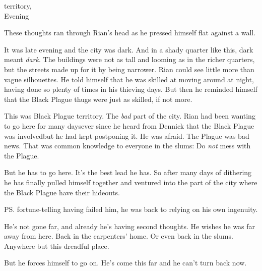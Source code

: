 \begin{comment}
\section{Rian is threatened by a thug}
\end{comment}
\stamp
  {\dateRianAndJorgen}
  {%
     territory, 
    \\
    Evening%
  }

These thoughts ran through Rian's head as he pressed himself flat against a wall. 

It was late evening and the city was dark. 
And in a shady quarter like this, dark meant \emph{dark}. 
The buildings were not as tall and looming as in the richer quarters, but the streets made up for it by being narrower. 
Rian could see little more than vague silhouettes. 
He told himself that he was skilled at moving around at night, having done so plenty of times in his thieving days. 
But then he reminded himself that the Black Plague thugs were just as skilled, if not more. 


This was Black Plague territory. 
The \emph{bad} part of the city. 
Rian had been wanting to go here for many days\dash ever since he heard from Dennick that the Black Plague was involved\dash but he had kept postponing it.
He was afraid. 
The Plague was bad news. 
That was common knowledge to everyone in the slums: 
Do \emph{not} mess with the Plague. 

But he has to go here. 
It's the best lead he has. 
So after many days of dithering he has finally pulled himself together and ventured into the part of the city where the Black Plague have their hideouts. 

\ps{\Uswa}{} fortune-telling having failed him, he was back to relying on his own ingenuity. 

He's not gone far, and already he's having second thoughts. 
He wishes he was far away from here. 
Back in the carpenters' home. 
Or even back in the slums. 
Anywhere but this dreadful place. 


But he forces himself to go on. 
He's come this far and he can't turn back now. 

